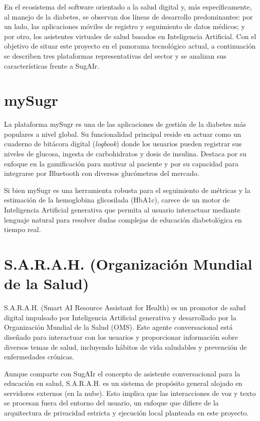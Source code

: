 
En el ecosistema del software orientado a la salud digital y, más específicamente, al manejo de la diabetes, se observan dos líneas de desarrollo predominantes: por un lado, las aplicaciones móviles de registro y seguimiento de datos médicos; y por otro, los asistentes virtuales de salud basados en Inteligencia Artificial. Con el objetivo de situar este proyecto en el panorama tecnológico actual, a continuación se describen tres plataformas representativas del sector y se analizan sus características frente a SugAIr.

\section{mySugr}
La plataforma mySugr \cite{mysugr} es una de las aplicaciones de gestión de la diabetes más populares a nivel global. Su funcionalidad principal reside en actuar como un cuaderno de bitácora digital (\textit{logbook}) donde los usuarios pueden registrar sus niveles de glucosa, ingesta de carbohidratos y dosis de insulina. Destaca por su enfoque en la gamificación para motivar al paciente y por su capacidad para integrarse por Bluetooth con diversos glucómetros del mercado.

Si bien mySugr es una herramienta robusta para el seguimiento de métricas y la estimación de la hemoglobina glicosilada (HbA1c), carece de un motor de Inteligencia Artificial generativa que permita al usuario interactuar mediante lenguaje natural para resolver dudas complejas de educación diabetológica en tiempo real.

\section{S.A.R.A.H. (Organización Mundial de la Salud)}
S.A.R.A.H. (Smart AI Resource Assistant for Health) \cite{sarah_who} es un promotor de salud digital impulsado por Inteligencia Artificial generativa y desarrollado por la Organización Mundial de la Salud (OMS). Este agente conversacional está diseñado para interactuar con los usuarios y proporcionar información sobre diversos temas de salud, incluyendo hábitos de vida saludables y prevención de enfermedades crónicas.

Aunque comparte con SugAIr el concepto de asistente conversacional para la educación en salud, S.A.R.A.H. es un sistema de propósito general alojado en servidores externos (en la nube). Esto implica que las interacciones de voz y texto se procesan fuera del entorno del usuario, un enfoque que difiere de la arquitectura de privacidad estricta y ejecución local planteada en este proyecto.

